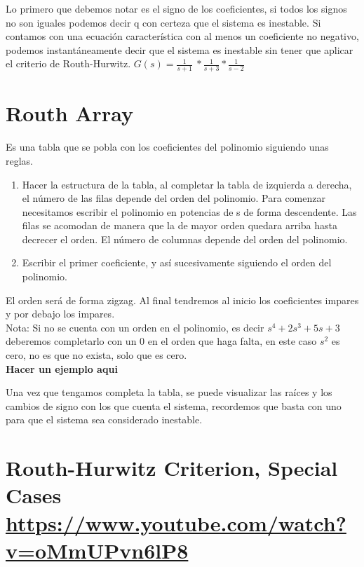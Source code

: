\documentclass[
	12pt, %
]{fphw}
\begin{document}
Lo primero que debemos notar es el signo de los coeficientes, si todos los signos no son iguales podemos decir q con certeza que el sistema es inestable. 
Si contamos con una ecuación característica con al menos un coeficiente no negativo, podemos instantáneamente decir que el sistema es inestable sin tener que aplicar el criterio de Routh-Hurwitz.
$G(s)=\frac{1}{s+1}\ * \frac{1}{s+3} * \frac{1}{s-2}$ \\

\section{Routh Array}

Es una tabla que se pobla con los coeficientes del polinomio siguiendo unas reglas.

\begin{enumerate}
\item{Hacer la estructura de la tabla, al completar la tabla de izquierda a derecha, el número de las filas depende del orden del polinomio.  Para comenzar necesitamos escribir el polinomio en potencias de s de forma descendente. Las filas se acomodan de manera que la de mayor orden quedara arriba hasta decrecer el orden. El número de columnas depende del orden del polinomio.}
\item{Escribir el primer coeficiente, y así sucesivamente siguiendo el orden del polinomio.}
\end{enumerate}

El orden será de forma zigzag. Al final tendremos al inicio los coeficientes impares y por debajo los impares.\\
Nota: Si no se cuenta con un orden en el polinomio, es decir $s^4 + 2s^3 + 5s + 3$ deberemos completarlo con un 0 en el orden que haga falta, en este caso $s^2$ es cero, no es que no exista, solo que es cero.\\

\textbf{Hacer un ejemplo aqui}

Una vez que tengamos completa la tabla, se puede visualizar las raíces y los cambios de signo con los que cuenta el sistema, recordemos que basta con uno para que el sistema sea considerado inestable. \\

\newpage
\section*{{\color{Apricot}Routh-Hurwitz Criterion, Special Cases} \url{https://www.youtube.com/watch?v=oMmUPvn6lP8}}
\end{document}
